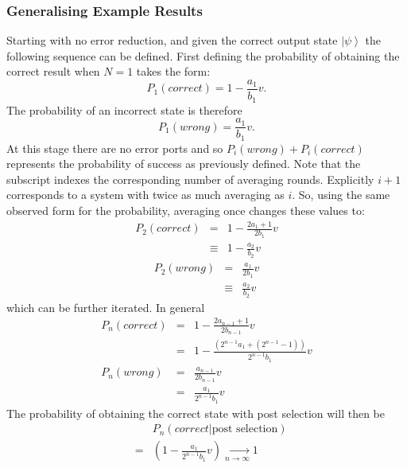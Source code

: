 \documentclass[aps,pra,twocolumn,superscriptaddress,numerical,floatfix]{revtex4-1}
\begin{document}
\subsubsection{Generalising Example Results}

Starting with no error reduction, and given the correct output state $\left|\psi\right\rangle $ the following sequence can be defined. First defining the probability of obtaining the correct result when $N=1$ takes the form:
\begin{equation}
P_{1}(correct)=1-\frac{a_{1}}{b_{1}}v.
\end{equation}
The probability of an incorrect state is therefore
\begin{equation}
P_{1}(wrong)=\frac{a_{1}}{b_{1}}v.
\end{equation}
At this stage there are no error ports and so $P_{i}(wrong)+P_{i}(correct)$ represents the probability of success as previously defined. Note that the subscript indexes the corresponding number of averaging rounds. Explicitly $i+1$ corresponds to a system with twice as much averaging as $i$.  So, using the same observed form for the probability, averaging once changes these values to:
\begin{eqnarray}
P_{2}(correct) & = & 1-\frac{2a_{1}+1}{2b_{1}}v\nonumber \\
& \equiv & 1-\frac{a_{2}}{b_{2}}v
\end{eqnarray}
\begin{eqnarray}
P_{2}(wrong) & = & \frac{a_{1}}{2b_{1}}v\nonumber \\
& \equiv & \frac{a_{2}}{b_{2}}v
\end{eqnarray}
which can be further iterated.  In general
\begin{eqnarray}
P_{n}(correct) & = & 1-\frac{2a_{n-1}+1}{2b_{n-1}}v\nonumber \\
& = & 1-\frac{\left(2^{n-1}a_{1}+\left(2^{n-1}-1\right)\right)}{2^{n-1}b_{1}}v\\
P_{n}(wrong) & = & \frac{a_{n-1}}{2b_{n-1}}v\nonumber \\
& = & \frac{a_{1}}{2^{n-1}b_{1}}v
\end{eqnarray}
The probability of obtaining the correct state with post selection will then be
\begin{eqnarray}
&  & P_{n}\left(correct\left|\textrm{post selection}\right.\right)\nonumber \\
& = & \left(1-\frac{a_{1}}{2^{n-1}b_{1}}v\right)\xrightarrow[n\rightarrow\infty]{}1\label{eq:PcorrectGeneral}
\end{eqnarray}
\end{document}
